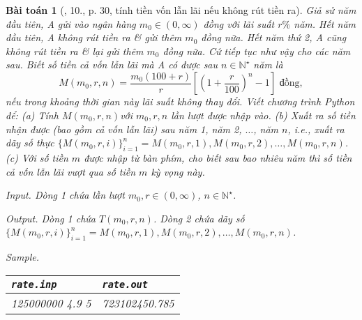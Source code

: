 \documentclass{article}
\newtheorem{baitoan}{Bài toán}
\begin{document}
\begin{baitoan}[\cite{CDHT_Toan_10_CD}, 10., p. 30, tính tiền vốn lẫn lãi nếu không rút tiền ra]
	Giả sử năm đầu tiên, A gửi vào ngân hàng $m_0\in(0,\infty)$ đồng với lãi suất $r\%$ năm. Hết năm đầu tiên, A không rút tiền ra \& gửi thêm $m_0$ đồng nữa. Hết năm thứ 2, A cũng không rút tiền ra \& lại gửi thêm $m_0$ đồng nữa. Cứ tiếp tục như vậy cho các năm sau. Biết số tiền cả vốn lẫn lãi mà A có được sau $n\in\mathbb{N}^\star$ năm là
	\begin{equation*}
		M(m_0,r,n) = \frac{m_0(100 + r)}{r}\left[\left(1 + \frac{r}{100}\right)^n - 1\right]\mbox{ đồng},
	\end{equation*}
	nếu trong khoảng thời gian này lãi suất không thay đổi. Viết chương trình Python để: (a) Tính $M(m_0,r,n)$với $m_0,r,n$ lần lượt được nhập vào. (b) Xuất ra số tiền nhận được (bao gồm cả vốn lẫn lãi) sau năm 1, năm 2, $\ldots$, năm $n$, i.e., xuất ra dãy số thực $\{M(m_0,r,i)\}_{i=1}^n = M(m_0,r,1),M(m_0,r,2),\ldots,M(m_0,r,n)$. (c) Với số tiền $m$ được nhập từ bàn phím, cho biết sau bao nhiêu năm thì số tiền cả vốn lẫn lãi vượt qua số tiền $m$ kỳ vọng này.
	\item {\sf Input.} Dòng 1 chứa lần lượt $m_0,r\in(0,\infty)$, $n\in\mathbb{N}^\star$.
	\item {\sf Output.} Dòng 1 chứa $T(m_0,r,n)$. Dòng 2 chứa dãy số $\{M(m_0,r,i)\}_{i=1}^n = M(m_0,r,1),M(m_0,r,2),\ldots,M(m_0,r,n)$.
	\item {\sf Sample.}
	\begin{table}[H]
		\centering
		\begin{tabular}{|l|l|}
			\hline
			{\tt rate.inp} & {\tt rate.out} \\
			\hline
			125000000 4.9 5 & 723102450.785  \\
			\hline
		\end{tabular}
	\end{table}
\end{baitoan}
\end{document}
